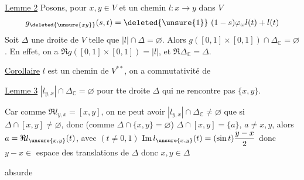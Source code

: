 \uline{Lemme 2} 
 Posons, pour $x,y\in V$ et un chemin
$l:x\to y$ dans $V$
\[
g_{\deleted{\unsure{xy}}}(s,t)=\deleted{\unsure{1}}\ (1-s)\varphi_\omega l(t)+l(t)
\]
Soit $\Delta$ une droite de $V$ telle que
 $|l|\cap\Delta=\varnothing$.
Alors $g([0,1]\times[0,1])\cap\Delta_{\mathbb C}=\varnothing$.
En effet, on a $\Re g([0,1]\times[0,1])=|l|$, et
$\Re\Delta_{\mathbb C}=\Delta$.

\uline{Corollaire}\quad {} $l$ est un chemin
de $V^{**}$, on a commutativité de

\uline{Lemme 3} 
$|l_{y,x}|\cap\Delta_{\mathbb C}=\varnothing$ pour tte
droite $\Delta$  qui ne rencontre pas $\{x,y\}$.

Car comme $\Re l_{y,x}=[x,y]$,
on ne peut avoir $|l_{y,x}|\cap\Delta_{\mathbb C}\ne\varnothing$ que si
$\Delta\cap[x,y]\ne\varnothing$, donc (comme $\Delta\cap\{x,y\}=\varnothing$)
$\Delta\cap[x,y]=\{a\}$, $a\ne x,y$, 
alors  $a=\Re l_{\unsure{x,y}}(t)$, avec $(t\ne0,1)$
$\operatorname{Im}l_{\unsure{x,y}}(t)=(\sin t)\dfrac{y-x}{2}$ donc
$y-x\in$ espace  des translations de $\Delta$
donc $x,y\in\Delta$\par
absurde
